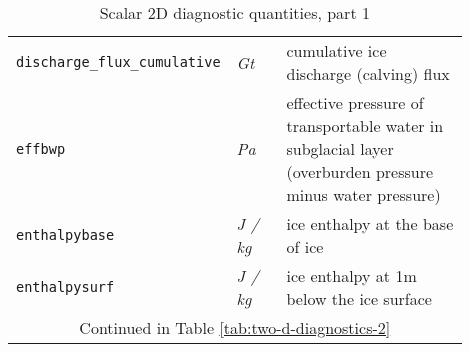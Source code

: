 \begin{table}[ht]
\begin{tabular}{p{0.15\linewidth}p{0.15\linewidth}p{0.6\linewidth}}
    \texttt{discharge_flux_cumulative} & \textsl{Gt} & cumulative ice discharge (calving) flux \\
    \texttt{effbwp} & \textsl{Pa} & effective pressure of transportable water in subglacial layer (overburden pressure minus water pressure)\\
    \texttt{enthalpybase} & \textsl{J  / kg} &  ice enthalpy at the base of ice \\
    \texttt{enthalpysurf} & \textsl{J  / kg} &  ice enthalpy at 1m below the ice surface \\
   \multicolumn{3}{c}{Continued in Table \ref{tab:two-d-diagnostics-2}}\\
  \bottomrule
  \end{tabular}
  \caption{Scalar 2D diagnostic quantities, part 1}
  \label{tab:two-d-diagnostics-1}
\end{table}

